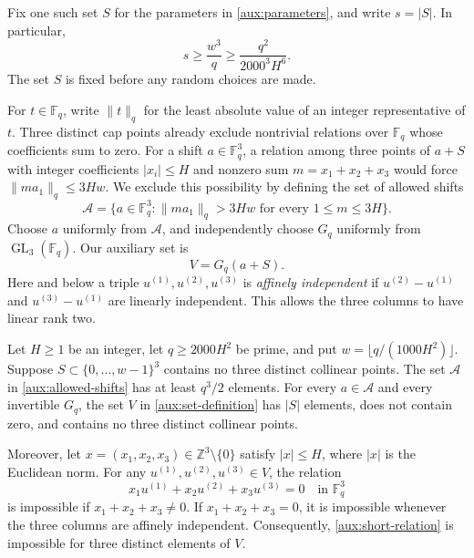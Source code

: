 Fix one such set $S$ for the parameters in \eqref{aux:parameters}, and
write $s=|S|$.  In particular,
\begin{equation}\label{aux:cap-size}
 s\ge\frac{w^3}{q}\ge\frac{q^2}{2000^3H^6}.
\end{equation}
The set $S$ is fixed before any random choices are made.

For $t\in\mathbb F_q$, write $\|t\|_q$ for the least absolute value of
an integer representative of $t$.  Three distinct cap points already
exclude nontrivial relations over $\mathbb F_q$ whose coefficients sum
to zero.  For a shift $a\in\mathbb F_q^3$, a relation among three points
of $a+S$ with integer
coefficients $|x_i|\le H$ and nonzero sum $m=x_1+x_2+x_3$ would force
$\|ma_1\|_q\le3Hw$.  We exclude this possibility by defining the set of
allowed shifts
\begin{equation}\label{aux:allowed-shifts}
 \mathcal A=
 \{a\in\mathbb F_q^3:
       \|ma_1\|_q>3Hw\text{ for every }1\le m\le3H\}.
\end{equation}
Choose $a$ uniformly from $\mathcal A$, and independently choose
$G_q$ uniformly from $\operatorname{GL}_3(\mathbb F_q)$.  Our auxiliary
set is
\begin{equation}\label{aux:set-definition}
 V=G_q(a+S).
\end{equation}
Here and below a triple $u^{(1)},u^{(2)},u^{(3)}$ is
\emph{affinely independent} if
$u^{(2)}-u^{(1)}$ and $u^{(3)}-u^{(1)}$ are linearly independent.
This allows the three columns to have linear rank two.

\begin{lemma}\label{aux:random-set}
Let $H\ge1$ be an integer, let $q\ge2000H^2$ be prime, and put
$w=\lfloor q/(1000H^2)\rfloor$.  Suppose
$S\subset\{0,\ldots,w-1\}^3$ contains no three distinct collinear
points.  The set $\mathcal A$ in \eqref{aux:allowed-shifts} has at least
$q^3/2$ elements.  For every $a\in\mathcal A$ and every invertible
$G_q$, the set $V$ in \eqref{aux:set-definition} has $|S|$ elements,
does not contain zero, and contains no three distinct collinear points.

Moreover, let $x=(x_1,x_2,x_3)\in\mathbb Z^3\setminus\{0\}$ satisfy
$|x|\le H$, where $|x|$ is the Euclidean norm.  For any
$u^{(1)},u^{(2)},u^{(3)}\in V$, the relation
\begin{equation}\label{aux:short-relation}
 x_1u^{(1)}+x_2u^{(2)}+x_3u^{(3)}=0
 \quad\text{in }\mathbb F_q^3
\end{equation}
is impossible if $x_1+x_2+x_3\ne0$.  If $x_1+x_2+x_3=0$, it is
impossible whenever the three columns are affinely independent.
Consequently, \eqref{aux:short-relation} is impossible for three
distinct elements of $V$.
\end{lemma}

